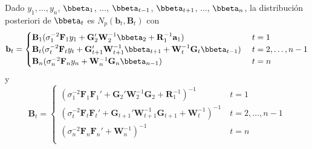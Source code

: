 \begin{Res}
Dado $y_1,\ldots,y_n$, $\bbeta_1$, $\ldots$, $\bbeta_{t-1}$, $\bbeta_{t+1}$, $\ldots$, $\bbeta_n$, la distribución posteriori de $\bbeta_t$ es $N_p(\mathbf{b}_t,\mathbf{B}_t)$ con
\begin{equation*}
\mathbf{b}_t=
\begin{cases}
\mathbf{B}_1(\sigma^{-2}_1\mathbf{F}_1y_1+\mathbf{G}_2'\mathbf{W}_2^{-1}\bbeta_2+\mathbf{R}_1^{-1}\mathbf{a}_1)&\ t=1\\
\mathbf{B}_t(\sigma^{-2}_t\mathbf{F}_ty_t+\mathbf{G}_{t+1}'\mathbf{W}_{t+1}^{-1}\bbeta_{t+1}+\mathbf{W}_t^{-1}\mathbf{G}_t\bbeta_{t-1})&\ t=2,\ldots,n-1\\
\mathbf{B}_n(\sigma^{-2}_n\mathbf{F}_ny_n+\mathbf{W}_n^{-1}\mathbf{G}_n\bbeta_{n-1})&\ t=n\\
\end{cases}
\end{equation*}
y
\begin{equation*}
\mathbf{B}_t=
\begin{cases}
(\sigma^{-2}_1\mathbf{F}_1\mathbf{F}_1'+\mathbf{G}_2'\mathbf{W}_2^{-1}\mathbf{G}_2+\mathbf{R}_1^{-1})^{-1}&\ t=1\\
(\sigma^{-2}_t\mathbf{F}_t\mathbf{F}_t'+\mathbf{G}_{t+1}'\mathbf{W}_{t+1}^{-1}\mathbf{G}_{t+1}+\mathbf{W}_t^{-1})^{-1}&\ t=2,\ldots,n-1\\
(\sigma^{-2}_n\mathbf{F}_n\mathbf{F}_n'+\mathbf{W}_n^{-1})^{-1}&\ t=n\\
\end{cases}
\end{equation*}
\end{Res}
